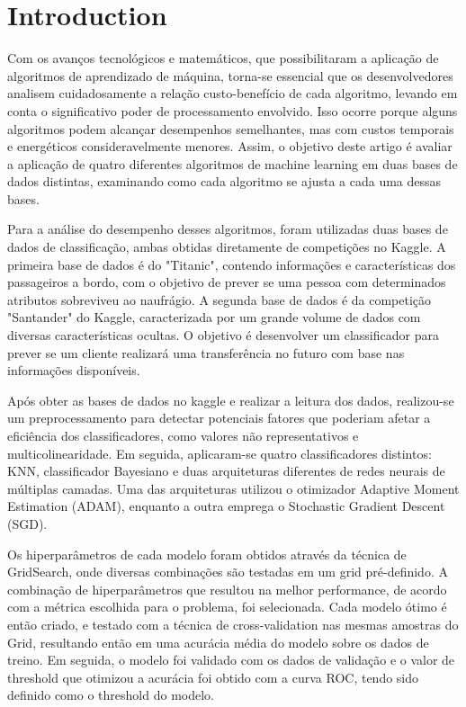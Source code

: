 \documentclass[conference]{IEEEtran}
\begin{document}
\section{Introduction}

Com os avanços tecnológicos e matemáticos, que possibilitaram a aplicação de algoritmos de aprendizado de máquina, torna-se essencial que os desenvolvedores analisem cuidadosamente a relação custo-benefício de cada algoritmo, levando em conta o significativo poder de processamento envolvido. Isso ocorre porque alguns algoritmos podem alcançar desempenhos semelhantes, mas com custos temporais e energéticos consideravelmente menores. Assim, o objetivo deste artigo é avaliar a aplicação de quatro diferentes algoritmos de machine learning em duas bases de dados distintas, examinando como cada algoritmo se ajusta a cada uma dessas bases.

Para a análise do desempenho desses algoritmos, foram utilizadas duas bases de dados de classificação, ambas obtidas diretamente de competições no Kaggle. A primeira base de dados é do "Titanic", contendo informações e características dos passageiros a bordo, com o objetivo de prever se uma pessoa com determinados atributos sobreviveu ao naufrágio. A segunda base de dados é da competição "Santander" do Kaggle, caracterizada por um grande volume de dados com diversas características ocultas. O objetivo é desenvolver um classificador para prever se um cliente realizará uma transferência no futuro com base nas informações disponíveis.

Após obter as bases de dados no kaggle e realizar a leitura dos dados, realizou-se um preprocessamento para detectar potenciais fatores que poderiam afetar a eficiência dos classificadores, como valores não representativos e multicolinearidade. Em seguida, aplicaram-se quatro classificadores distintos: KNN, classificador Bayesiano e duas arquiteturas diferentes de redes neurais de múltiplas camadas. Uma das arquiteturas utilizou o otimizador Adaptive Moment Estimation (ADAM), enquanto a outra emprega o Stochastic Gradient Descent (SGD). 

Os hiperparâmetros de cada modelo foram obtidos através da técnica de GridSearch, onde diversas combinações são testadas em um grid pré-definido. A combinação de hiperparâmetros que resultou na melhor performance, de acordo com a métrica escolhida para o problema, foi selecionada. Cada modelo ótimo é então criado, e testado com a técnica de cross-validation nas mesmas amostras do Grid, resultando então em uma acurácia média do modelo sobre os dados de treino. Em seguida, o modelo foi validado com os dados de validação e o valor de threshold que otimizou a acurácia foi obtido com a curva ROC, tendo sido definido como o threshold do modelo.
\end{document}

